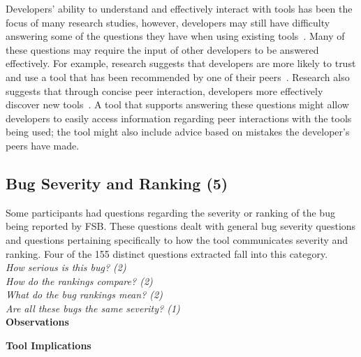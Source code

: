 \documentclass[conference]{IEEEtran}
\begin{document}
Developers' ability to understand and effectively interact with tools has been the focus of many research studies, however, developers may still have difficulty answering some of the questions they have when using existing tools~\cite{ko2004designing, khoo2008path, johnson2013don}. 
Many of these questions may require the input of other developers to be answered effectively. 
For example, research suggests that developers are more likely to trust and use a tool that has been recommended by one of their peers~\cite{murphy2010trust}.
Research also suggests that through concise peer interaction, developers more effectively discover new tools~\cite{murphy2011peer}. 
A tool that supports answering these questions might allow developers to easily access information regarding peer interactions with the tools being used; the tool might also include advice based on mistakes the developer's peers have made. 
 





\noindent\subsection{\textbf{Bug Severity and Ranking (5)}}\label{bsr}

Some participants had questions regarding the severity or ranking of the bug being reported by FSB. 
These questions dealt with general bug severity questions and questions pertaining specifically to how the tool communicates severity and ranking. 
Four of the 155 distinct questions extracted fall into this category. 
\\

\noindent\emph{How serious is this bug? (2)} \\
\emph{How do the rankings compare? (2)} \\
\emph{What do the bug rankings mean? (2)} \\
\emph{Are all these bugs the same severity? (1)} \\

\noindent\textbf{Observations}


\noindent\textbf{Tool Implications}
\end{document}
